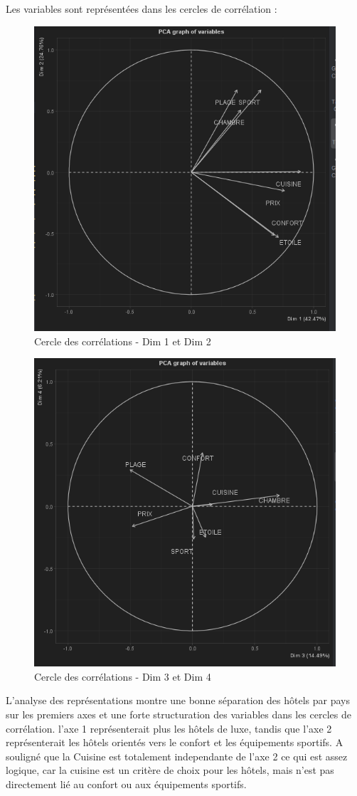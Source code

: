 \documentclass{article}
\begin{document}
    Les variables sont représentées dans les cercles de corrélation :

    \begin{figure}[H]
        \centering
        \includegraphics[width=0.6\linewidth]{img/PCA4}
        \caption{Cercle des corrélations - Dim 1 et Dim 2}
    \end{figure}

    \begin{figure}[H]
        \centering
        \includegraphics[width=0.6\linewidth]{img/PCA3}
        \caption{Cercle des corrélations - Dim 3 et Dim 4}
    \end{figure}

    L’analyse des représentations montre une bonne séparation des hôtels par pays sur les premiers axes et une forte structuration des variables dans les cercles de corrélation.
    l'axe 1 représenterait plus les hôtels de luxe, tandis que l'axe 2 représenterait les hôtels orientés vers le confort et les équipements sportifs.
    A souligné que la Cuisine est totalement independante de l'axe 2 ce qui est assez logique, car la cuisine est un critère de choix pour les hôtels, mais n'est pas directement lié au confort ou aux équipements sportifs.
\end{document}

